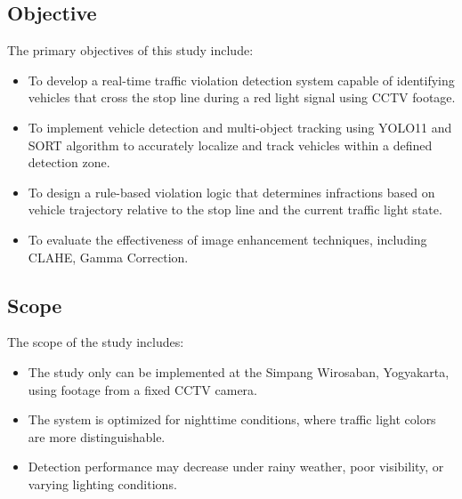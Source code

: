 \subsection{Objective}
The primary objectives of this study include:
\begin{itemize}
    \item To develop a real-time traffic violation detection system capable of identifying vehicles that cross the stop line during a red light signal using CCTV footage.
    \item To implement vehicle detection and multi-object tracking using YOLO11 and SORT algorithm to accurately localize and track vehicles within a defined detection zone.
    \item To design a rule-based violation logic that determines infractions based on vehicle trajectory relative to the stop line and the current traffic light state.
    \item To evaluate the effectiveness of image enhancement techniques, including CLAHE, Gamma Correction.
\end{itemize}

\subsection{Scope}
The scope of the study includes:
\begin{itemize}
    \item The study only can be implemented at the Simpang Wirosaban, Yogyakarta, using footage from a fixed CCTV camera.
    \item The system is optimized for nighttime conditions, where traffic light colors are more distinguishable.
    \item Detection performance may decrease under rainy weather, poor visibility, or varying lighting conditions.
\end{itemize}





